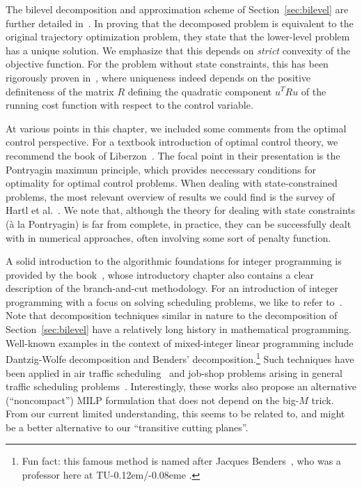 \documentclass[a4paper]{report}
\theoremstyle{definition}
\theoremstyle{plain}
\newcommand{\TUE}{TU\kern-0.12em/\kern-0.08eme }
\begin{document}
The bilevel decomposition and approximation scheme of Section~\ref{sec:bilevel}
are further detailed in~\cite{hultApproximateSolutionOptimal2015,hultTechnicalReportApproximate}.
%
In proving that the decomposed problem is equivalent to the original trajectory
optimization problem, they state that the lower-level problem has a unique
solution. We emphasize that this depends on \emph{strict} convexity of the objective function.
%
For the problem without state constraints, this has been rigorously proven in~\cite[Theorem 5.1, part
(V)]{hanUnifiedNumericalScheme2012}, where uniqueness indeed depends on the positive
definiteness of the matrix $R$ defining the quadratic component $u^T R u$ of the
running cost function with respect to the control variable.

At various points in this chapter, we included some comments from the optimal
control perspective. For a textbook introduction of optimal control theory, we
recommend the book of Liberzon~\cite{liberzonCalculusVariationsOptimal}. The focal point in their presentation is the
Pontryagin maximum principle, which provides neccessary conditions for
optimality for optimal control problems.
%
When dealing with state-constrained problems, the most relevant overview of
results we could find is the survey of Hartl et al.~\cite{hartlSurveyMaximumPrinciples1995}.
%
We note that, although the theory for dealing with state constraints (\`a la
Pontryagin) is far from complete, in practice, they can be successfully dealt
with in numerical approaches, often involving some sort of penalty function.

A solid introduction to the algorithmic foundations for integer programming is
provided by the book~\cite{confortiIntegerProgramming2014}, whose introductory chapter also contains a clear
description of the branch-and-cut methodology. For an introduction of integer
programming with a focus on solving scheduling problems, we like to refer
to~\cite[Appendix A]{pinedoSchedulingTheoryAlgorithms2016}.
%
Note that decomposition techniques similar in nature to the decomposition of
Section~\ref{sec:bilevel} have a relatively long history in mathematical programming.
Well-known examples in the context of mixed-integer linear programming include
Dantzig-Wolfe decomposition and Benders' decomposition.\footnote{Fun fact: this
  famous method is named after Jacques
  Benders~\cite{aardalJacquesBendersHis2025}, who was a professor here at \TUE.}
%
Such techniques have been applied in air traffic scheduling~\cite{manninoPathCycleFormulation2018} and job-shop
problems arising in general traffic scheduling problems~\cite{lamorgeseNoncompactFormulationJobShop2019}.
%
Interestingly, these works also propose an alternative (``noncompact'') MILP
formulation that does not depend on the big-$M$ trick. From our current limited
understanding, this seems to be related to, and might be a better alternative to
our ``transitive cutting planes''.
\end{document}
